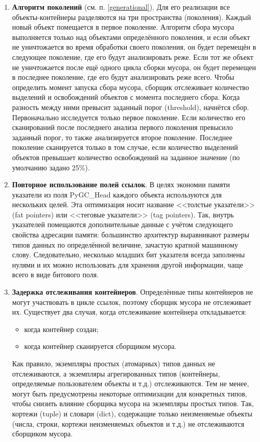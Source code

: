 \begin{enumerate}[label*=\arabic*.]
	\item \textbf{Алгоритм поколений} (см. п. \ref{generational}). Для его реализации все объекты-контейнеры разделяются на три пространства (поколения). Каждый новый объект помещается в первое поколение. Алгоритм сбора мусора выполняется только над объектами определённого поколения, и если объект не уничтожается во время обработки своего поколения, он будет перемещён в следующее поколение, где его будут анализировать реже. Если тот же объект не уничтожается после ещё одного цикла сборки мусора, он будет перемещен в последнее поколение, где его будут анализировать реже всего. Чтобы определить момент запуска сбора мусора, сборщик отслеживает количество выделений и освобождений объектов с момента последнего сбора. Когда разность между ними превысит заданный порог (threshold), начнётся сбор. Первоначально исследуется только первое поколение. Если количество его сканирований после последнего анализа первого поколения превысило заданный порог, то также анализируется второе поколение. Последнее поколение сканируется только в том случае, если количество выделений объектов превышает количество освобождений на заданное значение (по умолчанию задано 25\%). \cite{python_gc}
	
	\item \textbf{Повторное использование полей ссылок}. В целях экономии памяти указатели из поля PyGC\_Head каждого объекта используются для нескольких целей. Эта оптимизация носит название <<толстые указатели>> (fat pointers) или <<теговые указатели>> (tag pointers). Так, внутрь указателей помещаются дополнительные данные с учётом следующего свойства адресации памяти: большинство архитектур выравнивают размеры типов данных по определённой величине, зачастую кратной машинному слову. Следовательно, несколько младших бит указателя всегда заполнены нулями и их можно использовать для хранения другой информации, чаще всего в виде битового поля. \cite{python_gc}
	
	\item \textbf{Задержка отслеживания контейнеров}. Определённые типы контейнеров не могут участвовать в цикле ссылок, поэтому сборщик мусора не отслеживает их. Существует два случая, когда отслеживание контейнера откладывается:
	\begin{itemize}[label*=---]
		\item когда контейнер создан;
		\item когда контейнер сканируется сборщиком мусора.
	\end{itemize}
	Как правило, экземпляры простых (атомарных) типов данных не отслеживаются, а экземпляры агрегированных типов (контейнеры, определяемые пользователем объекты и т.д.) отслеживаются. Тем не менее, могут быть предусмотрены некоторые оптимизации для конкретных типов, чтобы снизить влияние сборщика мусора на экземпляры простых типов. Так, кортежи (tuple) и словари (dict), содержащие только неизменяемые объекты (числа, строки, кортежи неизменяемых объектов и т.д.) не отслеживаются сборщиком мусора. \cite{python_gc}
\end{enumerate}

